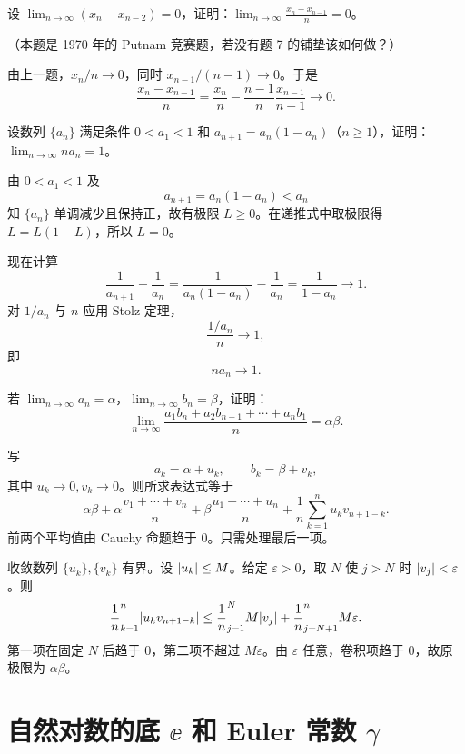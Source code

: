 \begin{xexercise}[8]
设 $\displaystyle\lim_{n\to\infty}(x_n-x_{n-2})=0$，证明：$\displaystyle\lim_{n\to\infty}\frac{x_n-x_{n-1}}n=0$。

  （本题是 1970 年的 Putnam 竞赛题，若没有题 7 的铺垫该如何做？）
\end{xexercise}
\begin{xsolution}
由上一题，$x_n/n\to0$，同时 $x_{n-1}/(n-1)\to0$。于是
\[
  \frac{x_n-x_{n-1}}n
  =\frac{x_n}{n}-\frac{n-1}{n}\frac{x_{n-1}}{n-1}\to0.
\]
\end{xsolution}


\begin{xexercise}[9]
设数列 $\{a_n\}$ 满足条件 $0<a_1<1$ 和 $a_{n+1}=a_n(1-a_n)$（$n\ge1$），证明：$\displaystyle\lim_{n\to\infty}na_n=1$。
\end{xexercise}
\begin{xsolution}
由 $0<a_1<1$ 及
\[
  a_{n+1}=a_n(1-a_n)<a_n
\]
知 $\{a_n\}$ 单调减少且保持正，故有极限 $L\ge0$。在递推式中取极限得 $L=L(1-L)$，所以 $L=0$。

现在计算
\[
  \frac1{a_{n+1}}-\frac1{a_n}
  =\frac1{a_n(1-a_n)}-\frac1{a_n}
  =\frac1{1-a_n}\to1.
\]
对 $1/a_n$ 与 $n$ 应用 Stolz 定理，
\[
  \frac{1/a_n}{n}\to1,
\]
即
\[
  \boxed{na_n\to1}.
\]
\end{xsolution}


\begin{xexercise}[10]
若 $\displaystyle\lim_{n\to\infty}a_n=\alpha$，$\displaystyle\lim_{n\to\infty}b_n=\beta$，证明：
  \[
    \lim_{n\to\infty}\frac{a_1b_n+a_2b_{n-1}+\cdots+a_nb_1}{n}=\alpha\beta.
  \]
\end{xexercise}
\begin{xsolution}
写
\[
  a_k=\alpha+u_k,\qquad b_k=\beta+v_k,
\]
其中 $u_k\to0,v_k\to0$。则所求表达式等于
\[
  \alpha\beta
  +\alpha\frac{v_1+\cdots+v_n}{n}
  +\beta\frac{u_1+\cdots+u_n}{n}
  +\frac1n\sum_{k=1}^n u_kv_{n+1-k}.
\]
前两个平均值由 Cauchy 命题趋于 $0$。只需处理最后一项。

收敛数列 $\{u_k\},\{v_k\}$ 有界。设 $\lvert u_k\rvert\le M$。给定 $\varepsilon>0$，取 $N$ 使 $j>N$ 时 $\lvert v_j\rvert<\varepsilon$。则
\[
  \frac1n\relax_{k=1}^n\lvert u_kv_{n+1-k}\rvert
  \le \frac1n\relax_{j=1}^N M\lvert v_j\rvert
     +\frac1n\relax_{j=N+1}^n M\varepsilon.
\]
第一项在固定 $N$ 后趋于 $0$，第二项不超过 $M\varepsilon$。由 $\varepsilon$ 任意，卷积项趋于 $0$，故原极限为 $\alpha\beta$。
\end{xsolution}


\section{\texorpdfstring{自然对数的底 $\ee$ 和 Euler 常数 $\gamma$}{自然对数的底 e 和 Euler 常数 gamma}}

